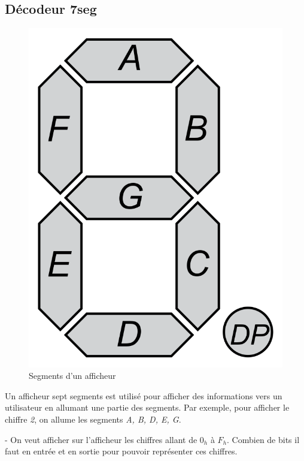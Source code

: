 \newpage

\subsection{Décodeur 7seg}

\begin{figure}[ht]
    \centering
    \includegraphics[scale = 0.1]{img/SevenSegDisplay.png}
    \caption{Segments d'un afficheur}
\end{figure}

Un afficheur sept segments est utilisé pour afficher des informations vers un utilisateur en allumant une partie des segments. Par exemple, pour afficher le chiffre \textit{2}, on allume les segments \textit{A, B, D, E, G}.

\medskip

- On veut afficher sur l'afficheur les chiffres allant de $0_h$ à $F_h$. Combien de bits il faut en entrée et en sortie pour pouvoir représenter ces chiffres.

